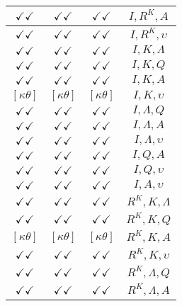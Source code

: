 \documentclass[a4paper,10pt]{article}
\begin{document}
\begin{longtable}{|c|c|c|c|}
\hline
$\checkmark\checkmark$ & $\checkmark\checkmark$ & $\checkmark\checkmark$ & ${I},{R^{K}},{A}$ \\
\hline
$\checkmark\checkmark$ & $\checkmark\checkmark$ & $\checkmark\checkmark$ & ${I},{R^{K}},{\upsilon}$ \\
\hline
$\checkmark\checkmark$ & $\checkmark\checkmark$ & $\checkmark\checkmark$ & ${I},{K},{\Lambda}$ \\
\hline
$\checkmark\checkmark$ & $\checkmark\checkmark$ & $\checkmark\checkmark$ & ${I},{K},{Q}$ \\
\hline
$\checkmark\checkmark$ & $\checkmark\checkmark$ & $\checkmark\checkmark$ & ${I},{K},{A}$ \\
\hline
$[\kappa \theta ]$ & $[\kappa \theta ]$ & $[\kappa \theta ]$ & ${I},{K},{\upsilon}$ \\
\hline
$\checkmark\checkmark$ & $\checkmark\checkmark$ & $\checkmark\checkmark$ & ${I},{\Lambda},{Q}$ \\
\hline
$\checkmark\checkmark$ & $\checkmark\checkmark$ & $\checkmark\checkmark$ & ${I},{\Lambda},{A}$ \\
\hline
$\checkmark\checkmark$ & $\checkmark\checkmark$ & $\checkmark\checkmark$ & ${I},{\Lambda},{\upsilon}$ \\
\hline
$\checkmark\checkmark$ & $\checkmark\checkmark$ & $\checkmark\checkmark$ & ${I},{Q},{A}$ \\
\hline
$\checkmark\checkmark$ & $\checkmark\checkmark$ & $\checkmark\checkmark$ & ${I},{Q},{\upsilon}$ \\
\hline
$\checkmark\checkmark$ & $\checkmark\checkmark$ & $\checkmark\checkmark$ & ${I},{A},{\upsilon}$ \\
\hline
$\checkmark\checkmark$ & $\checkmark\checkmark$ & $\checkmark\checkmark$ & ${R^{K}},{K},{\Lambda}$ \\
\hline
$\checkmark\checkmark$ & $\checkmark\checkmark$ & $\checkmark\checkmark$ & ${R^{K}},{K},{Q}$ \\
\hline
$[\kappa \theta ]$ & $[\kappa \theta ]$ & $[\kappa \theta ]$ & ${R^{K}},{K},{A}$ \\
\hline
$\checkmark\checkmark$ & $\checkmark\checkmark$ & $\checkmark\checkmark$ & ${R^{K}},{K},{\upsilon}$ \\
\hline
$\checkmark\checkmark$ & $\checkmark\checkmark$ & $\checkmark\checkmark$ & ${R^{K}},{\Lambda},{Q}$ \\
\hline
$\checkmark\checkmark$ & $\checkmark\checkmark$ & $\checkmark\checkmark$ & ${R^{K}},{\Lambda},{A}$ \\
\hline

\end{longtable}
\end{document}

